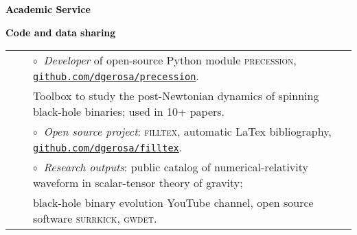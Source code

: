 \documentclass[letterpaper]{moderncv}
\begin{document}
\vspace{0.2cm}
\textbf{\textcolor{black}{Academic Service}}\vspace{0.05cm}\\
\vspace{-0.1cm}
\vspace{-0.1cm}
\vspace{-0.1cm}
\vspace{-0.1cm}



\vspace{0.2cm}
\textbf{\textcolor{black}{Code and data sharing}}\vspace{0.05cm}\\
\begin{tabular}{rcl}
&\hspace{0.4cm} &$\circ\;\;${\textit{Developer}} of open-source Python module \textsc{precession}, \href{https://github.com/dgerosa/precession}{\texttt{github.com/dgerosa/precession}}.
\\ &\hspace{0.4cm} &  \hspace{0.4cm}Toolbox to study the post-Newtonian dynamics of  spinning black-hole binaries; used in 10+  papers. \\
&\hspace{0.4cm} &$\circ\;\;${\textit{Open source project}}: \textsc{filltex}, automatic LaTex bibliography, \href{https://github.com/dgerosa/filltex}{\texttt{github.com/dgerosa/filltex}}.\\
&\hspace{0.4cm} &$\circ\;\;$\textit{Research outputs}: public catalog of numerical-relativity waveform in scalar-tensor theory of gravity; 
\\ &\hspace{0.4cm} &  \hspace{0.4cm}black-hole binary evolution YouTube channel, open source software \textsc{surrkick}, \textsc{gwdet}.
\end{tabular}
\end{document}
